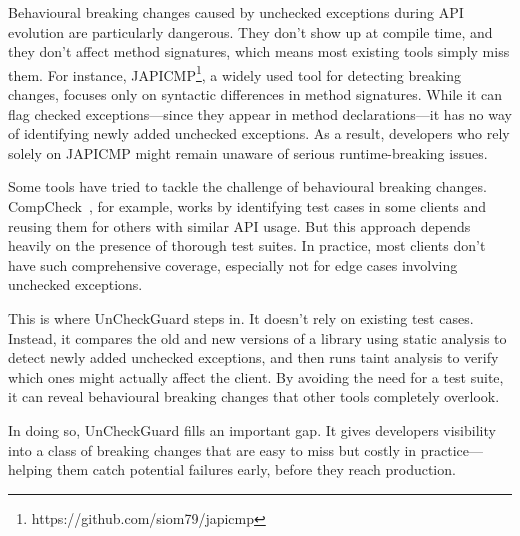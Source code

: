 Behavioural breaking changes caused by unchecked exceptions during API evolution are particularly dangerous. They don’t show up at compile time, and they don’t affect method signatures, which means most existing tools simply miss them. For instance, JAPICMP\footnote{https://github.com/siom79/japicmp}, a widely used tool for detecting breaking changes, focuses only on syntactic differences in method signatures. While it can flag checked exceptions—since they appear in method declarations—it has no way of identifying newly added unchecked exceptions. As a result, developers who rely solely on JAPICMP might remain unaware of serious runtime-breaking issues.

Some tools have tried to tackle the challenge of behavioural breaking changes. CompCheck~\cite{CompCheck}, for example, works by identifying test cases in some clients and reusing them for others with similar API usage. But this approach depends heavily on the presence of thorough test suites. In practice, most clients don’t have such comprehensive coverage, especially not for edge cases involving unchecked exceptions.

This is where UnCheckGuard steps in. It doesn’t rely on existing test cases. Instead, it compares the old and new versions of a library using static analysis to detect newly added unchecked exceptions, and then runs taint analysis to verify which ones might actually affect the client. By avoiding the need for a test suite, it can reveal behavioural breaking changes that other tools completely overlook.

In doing so, UnCheckGuard fills an important gap. It gives developers visibility into a class of breaking changes that are easy to miss but costly in practice—helping them catch potential failures early, before they reach production.
